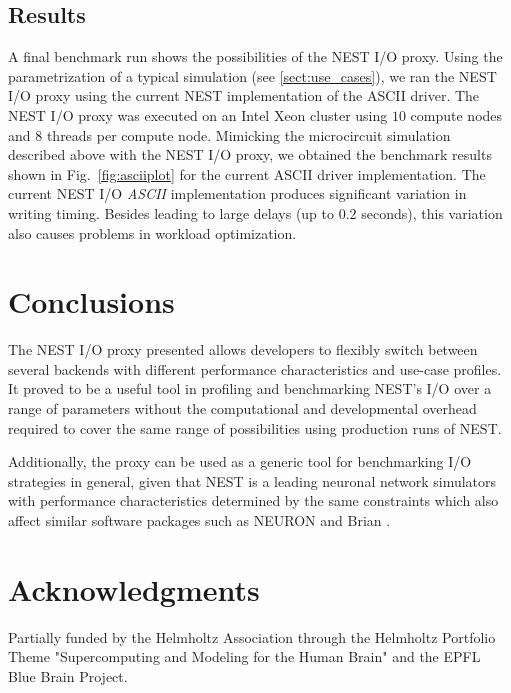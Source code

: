 \documentclass[]{YIC2015}
\begin{document}
\subsection{Results}

A final benchmark run shows the possibilities of the NEST I/O proxy.  Using
the parametrization of a typical simulation (see
\ref{sect:use_cases}), we ran the NEST I/O proxy using the current NEST
implementation of the ASCII driver.
The NEST I/O proxy was executed on an Intel Xeon cluster using $10$ compute
nodes and $8$ threads per compute node. Mimicking the microcircuit
simulation described above with the NEST I/O proxy, we obtained the
benchmark results shown in Fig.~\ref{fig:asciiplot} for the current
ASCII driver implementation. The current NEST I/O \emph{ASCII}
implementation produces significant variation in writing timing.
Besides leading to large delays (up to $0.2$ seconds), this variation
also causes problems in workload optimization.

\section{Conclusions}

The NEST I/O proxy presented allows developers to flexibly switch
between several backends with different performance characteristics
and use-case profiles. It proved to be a useful tool in profiling and
benchmarking NEST's I/O over a range of parameters without the
computational and developmental overhead required to cover the same
range of possibilities using production runs of NEST.

Additionally, the proxy can be used as a generic tool for benchmarking
I/O strategies in general, given that NEST is a leading neuronal
network simulators with performance characteristics determined by the
same constraints which also affect similar software packages such as
NEURON \cite{neuron} and Brian \cite{brian}.

\section*{Acknowledgments}

Partially funded by the Helmholtz Association through the Helmholtz
Portfolio Theme "Supercomputing and Modeling for the Human Brain" and the EPFL Blue Brain Project.
\end{document}
